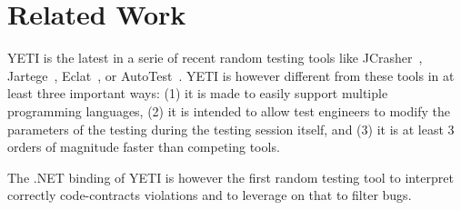 \section{Related Work}\label{sec:rw}


YETI is the latest in a serie of recent random testing tools like
JCrasher~\cite{Csallner2004}, Jartege~\cite{Oriat2004},
Eclat~\cite{Pacheco2005}, or
AutoTest~\cite{CPLOM:08:PRTOOS}. 
YETI is however 
different from these tools in at least three important ways: (1) it is made to 
easily support multiple programming languages, (2) 
it is intended to allow test engineers to modify the parameters of the 
testing during the testing session itself, and (3) it is at least 3 orders 
of magnitude faster than competing tools. 




The .NET binding of YETI is however the first random testing tool to interpret correctly 
code-contracts violations and to leverage on that to filter bugs.